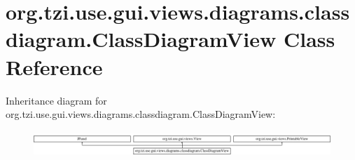 \hypertarget{classorg_1_1tzi_1_1use_1_1gui_1_1views_1_1diagrams_1_1classdiagram_1_1_class_diagram_view}{\section{org.\-tzi.\-use.\-gui.\-views.\-diagrams.\-classdiagram.\-Class\-Diagram\-View Class Reference}
\label{classorg_1_1tzi_1_1use_1_1gui_1_1views_1_1diagrams_1_1classdiagram_1_1_class_diagram_view}
}
Inheritance diagram for org.\-tzi.\-use.\-gui.\-views.\-diagrams.\-classdiagram.\-Class\-Diagram\-View\-:\begin{figure}[H]
\begin{center}
\leavevmode
\includegraphics[height=0.985048cm]{classorg_1_1tzi_1_1use_1_1gui_1_1views_1_1diagrams_1_1classdiagram_1_1_class_diagram_view}
\end{center}
\end{figure}
